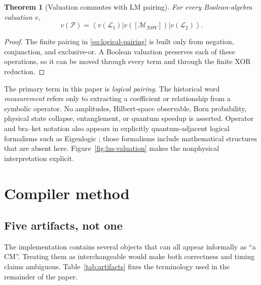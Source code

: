 \documentclass[11pt]{article}
\newcommand{\stateket}[1]{\left|#1\right\rangle}
\newcommand{\statebra}[1]{\left\langle#1\right|}
\newtheorem{theorem}{Theorem}
\begin{document}
{\begin{theorem}[Valuation commutes with LM pairing]
For every Boolean-algebra valuation $v$,
\begin{equation}
  v(\mathcal{P})
  =\statebra{v(\mathcal{L}_1)}
     v\!\left([\mathcal{M}_{X\Theta Y}]\right)
     \stateket{v(\mathcal{L}_2)}.
  \label{eq:valuation-commutes}
\end{equation}
\end{theorem}

\begin{proof}
The finite pairing in \eqref{eq:logical-pairing} is built only from
negation, conjunction, and exclusive-or. A Boolean valuation preserves each
of these operations, so it can be moved through every term and through the
finite XOR reduction.
\end{proof}

The primary term in this paper is \emph{logical pairing}. The historical word
\emph{measurement} refers only to extracting a coefficient or relationship
from a symbolic operator. No amplitudes,
Hilbert-space observable, Born probability, physical state collapse,
entanglement, or quantum speedup is asserted. Operator and bra--ket notation
also appears in explicitly quantum-adjacent logical formalisms such as
Eigenlogic \citep{toffano2015,duboistoffano2016}; those formalisms include
mathematical structures that are absent here. Figure~\ref{fig:lm-valuation}
makes the nonphysical interpretation explicit.

}

\section{Compiler method}
\label{sec:compiler}

\subsection{Five artifacts, not one}

The implementation contains several objects that can all appear informally as
\enquote{a CM}. Treating them as interchangeable would make both correctness
and timing claims ambiguous. Table~\ref{tab:artifacts} fixes the terminology
used in the remainder of the paper.
\end{document}
